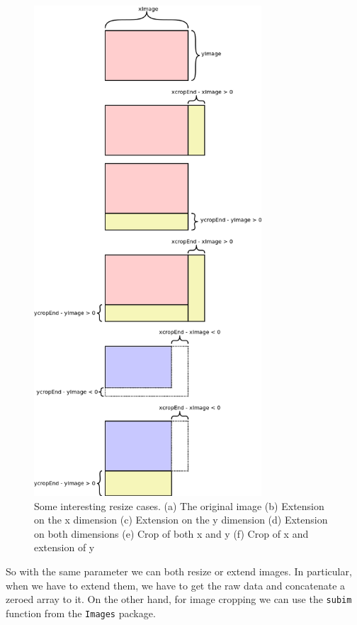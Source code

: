 \documentclass[11pt,oneside]{article}	%
\begin{document}
\begin{figure}[htbp] %
   \centering
   \includegraphics[width=8.5cm]{images/resizeCases.png} \hfill
   \caption{Some interesting resize cases. (a) The original image (b) Extension on the x dimension (c) Extension on the y dimension (d) Extension on both dimensions (e) Crop of both x and y (f) Crop of x and extension of y}
   \label{fig:resizeCases}
\end{figure}

So with the same parameter we can both resize or extend images. In particular, when we have to extend them, we have to get the raw data and concatenate a zeroed array to it. On the other hand, for image cropping we can use the \texttt{subim} function from the \texttt{Images} package.
\end{document}
